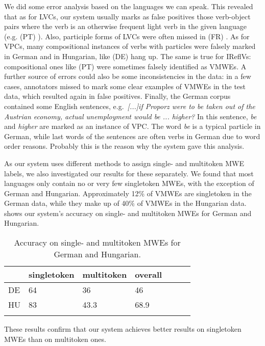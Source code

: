 \documentclass[output=paper,
modfonts,
]{langscibook}
\begin{document}
We did some error analysis based on the languages we can speak. This revealed that as for LVCs, our system usually marks as false positives those verb-object pairs where the verb is an otherwise frequent light verb in the given language (e.g. (PT) ). Also, participle forms of LVCs were often missed in (FR) . As for VPCs, many compositional instances of verbs with particles were falsely marked in German and in Hungarian, like (DE)  {hang up}. The same is true for IReflVs: compositional ones like (PT)  were sometimes falsely identified as VMWEs. A further source of errors could also be some inconsistencies in the data: in a few cases, annotators missed to mark some clear examples of VMWEs in the test data, which resulted again in false positives. Finally, the German corpus contained some English sentences, e.g.~\textit{[...]if Proporz were to be taken out of the Austrian economy, actual unemployment would be ... higher?} In this sentence, \textit{be} and \textit{higher} are marked as an instance of VPC. The word \textit{be} is a typical particle in German, while last words of the sentences are often verbs in German due to word order reasons. Probably this is the reason why the system gave this analysis.

As our system uses different methods to assign single- and multitoken MWE labels, we also investigated our results for these separately. We found that most languages only contain no or very few singletoken MWEs, with the exception of German and Hungarian. Approximately 12\% of VMWEs are singletoken in the German data, while they make up of 40\% of VMWEs in the Hungarian data.  shows our system's accuracy on single- and multitoken MWEs for German and Hungarian.

\begin{table}
\centering
\caption{Accuracy on single- and multitoken MWEs for German and Hungarian.}
\label{singletokenresults}
\begin{tabular}{lllllll}
  \lsptoprule
  & singletoken & multitoken & overall  \\
 \midrule
 DE  & 64 & 36 & 46   \\
HU  & 83  & 43.3 & 68.9 \\
  \lspbottomrule
\end{tabular}
\end{table}

These results confirm that our system achieves better results on singletoken MWEs than on multitoken ones.
\end{document}
